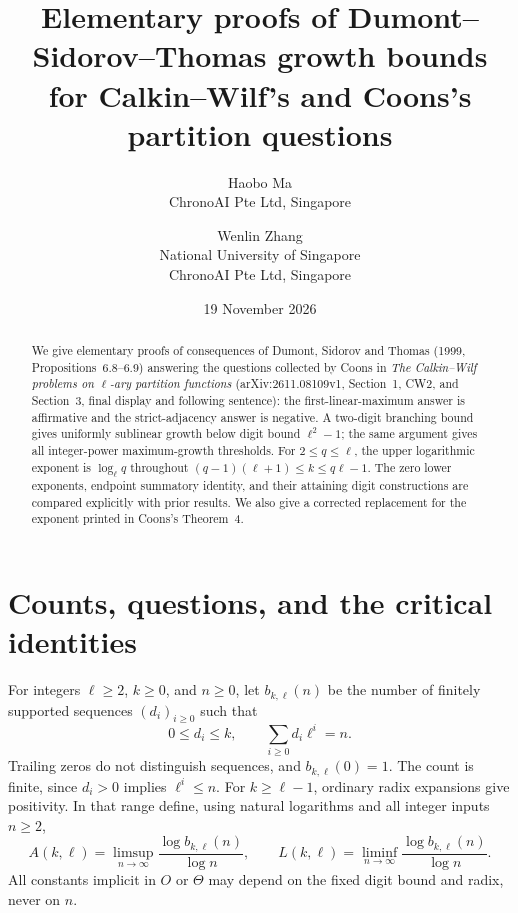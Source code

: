 \documentclass[11pt]{article}
\title{Elementary proofs of Dumont--Sidorov--Thomas growth bounds\\
for Calkin--Wilf's and Coons's partition questions}
\author{Haobo Ma\\\small ChronoAI Pte Ltd, Singapore
\and Wenlin Zhang\\\small National University of Singapore\\\small ChronoAI Pte Ltd, Singapore}
\date{19 November 2026}
\begin{document}
\maketitle
\begin{abstract}
We give elementary proofs of consequences of Dumont, Sidorov and
Thomas (1999, Propositions~6.8--6.9) answering the questions collected
by Coons in \emph{The Calkin--Wilf problems on $\ell$-ary partition
functions} (arXiv:2611.08109v1, Section~1, CW2, and Section~3,
final display and following sentence): the first-linear-maximum
answer is affirmative and the strict-adjacency answer is negative.
A two-digit branching bound gives uniformly sublinear growth below
digit bound $\ell^2-1$; the same argument gives all integer-power
maximum-growth thresholds.
For $2\le q\le\ell$, the upper logarithmic exponent is $\log_\ell q$
throughout $(q-1)(\ell+1)\le k\le q\ell-1$.
The zero lower exponents, endpoint summatory identity, and their
attaining digit constructions are compared explicitly with prior
results. We also give a corrected replacement for the exponent
printed in Coons's Theorem~4.
\end{abstract}

\section{Counts, questions, and the critical identities}
For integers $\ell\ge2$, $k\ge0$, and $n\ge0$, let $b_{k,\ell}(n)$ be
the number of finitely supported sequences $(d_i)_{i\ge0}$ such that
\[
 0\le d_i\le k,\qquad \sum_{i\ge0}d_i\ell^i=n.
\]
Trailing zeros do not distinguish sequences, and $b_{k,\ell}(0)=1$.
The count is finite, since $d_i>0$ implies $\ell^i\le n$.
For $k\ge\ell-1$, ordinary radix expansions give positivity. In that
range define, using natural logarithms and all integer inputs $n\ge2$,
\[
 A(k,\ell)=\limsup_{n\to\infty}\frac{\log b_{k,\ell}(n)}{\log n},
 \qquad
 L(k,\ell)=\liminf_{n\to\infty}\frac{\log b_{k,\ell}(n)}{\log n}.
\]
All constants implicit in $O$ or $\Theta$ may depend on the fixed digit
bound and radix, never on $n$.
\end{document}
